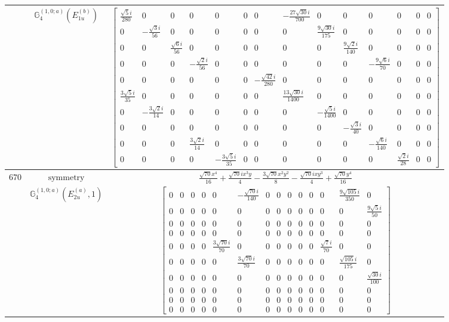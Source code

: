 \documentclass[fleqn,8pt,landscape]{jsarticle}
\begin{document}
\begin{longtable}{ccc}
$  $ & $ \mathbb{G}_{4}^{(1,0;a)}(E_{1u}^{(b)}) $ & $ \begin{bmatrix} \frac{\sqrt{5} i}{280} & 0 & 0 & 0 & 0 & 0 & 0 & - \frac{27 \sqrt{30} i}{700} & 0 & 0 & 0 & 0 & 0 & 0 \\ 0 & - \frac{\sqrt{3} i}{56} & 0 & 0 & 0 & 0 & 0 & 0 & \frac{9 \sqrt{30} i}{175} & 0 & 0 & 0 & 0 & 0 \\ 0 & 0 & \frac{\sqrt{6} i}{56} & 0 & 0 & 0 & 0 & 0 & 0 & \frac{9 \sqrt{2} i}{140} & 0 & 0 & 0 & 0 \\ 0 & 0 & 0 & - \frac{\sqrt{2} i}{56} & 0 & 0 & 0 & 0 & 0 & 0 & - \frac{9 \sqrt{6} i}{70} & 0 & 0 & 0 \\ 0 & 0 & 0 & 0 & 0 & 0 & - \frac{\sqrt{42} i}{280} & 0 & 0 & 0 & 0 & 0 & 0 & 0 \\ \frac{3 \sqrt{5} i}{35} & 0 & 0 & 0 & 0 & 0 & 0 & \frac{13 \sqrt{30} i}{1400} & 0 & 0 & 0 & 0 & 0 & 0 \\ 0 & - \frac{3 \sqrt{2} i}{14} & 0 & 0 & 0 & 0 & 0 & 0 & - \frac{\sqrt{5} i}{1400} & 0 & 0 & 0 & 0 & 0 \\ 0 & 0 & 0 & 0 & 0 & 0 & 0 & 0 & 0 & - \frac{\sqrt{3} i}{40} & 0 & 0 & 0 & 0 \\ 0 & 0 & 0 & \frac{3 \sqrt{2} i}{14} & 0 & 0 & 0 & 0 & 0 & 0 & - \frac{\sqrt{6} i}{140} & 0 & 0 & 0 \\ 0 & 0 & 0 & 0 & - \frac{3 \sqrt{5} i}{35} & 0 & 0 & 0 & 0 & 0 & 0 & \frac{\sqrt{2} i}{28} & 0 & 0 \end{bmatrix} $ \\ \hline
$ 670 $ & $ \text{symmetry} $ & $ \frac{\sqrt{70} x^{4}}{16} + \frac{\sqrt{70} i x^{3} y}{4} - \frac{3 \sqrt{70} x^{2} y^{2}}{8} - \frac{\sqrt{70} i x y^{3}}{4} + \frac{\sqrt{70} y^{4}}{16} $ \\
$  $ & $ \mathbb{G}_{4}^{(1,0;a)}(E_{2u}^{(a)},1) $ & $ \begin{bmatrix} 0 & 0 & 0 & 0 & 0 & - \frac{\sqrt{70} i}{140} & 0 & 0 & 0 & 0 & 0 & 0 & \frac{9 \sqrt{105} i}{350} & 0 \\ 0 & 0 & 0 & 0 & 0 & 0 & 0 & 0 & 0 & 0 & 0 & 0 & 0 & \frac{9 \sqrt{5} i}{50} \\ 0 & 0 & 0 & 0 & 0 & 0 & 0 & 0 & 0 & 0 & 0 & 0 & 0 & 0 \\ 0 & 0 & 0 & 0 & 0 & 0 & 0 & 0 & 0 & 0 & 0 & 0 & 0 & 0 \\ 0 & 0 & 0 & 0 & \frac{3 \sqrt{70} i}{70} & 0 & 0 & 0 & 0 & 0 & 0 & \frac{\sqrt{7} i}{70} & 0 & 0 \\ 0 & 0 & 0 & 0 & 0 & \frac{3 \sqrt{70} i}{70} & 0 & 0 & 0 & 0 & 0 & 0 & \frac{\sqrt{105} i}{175} & 0 \\ 0 & 0 & 0 & 0 & 0 & 0 & 0 & 0 & 0 & 0 & 0 & 0 & 0 & \frac{\sqrt{30} i}{100} \\ 0 & 0 & 0 & 0 & 0 & 0 & 0 & 0 & 0 & 0 & 0 & 0 & 0 & 0 \\ 0 & 0 & 0 & 0 & 0 & 0 & 0 & 0 & 0 & 0 & 0 & 0 & 0 & 0 \\ 0 & 0 & 0 & 0 & 0 & 0 & 0 & 0 & 0 & 0 & 0 & 0 & 0 & 0 \end{bmatrix} $ \\ \hline

\end{longtable}
\end{document}
